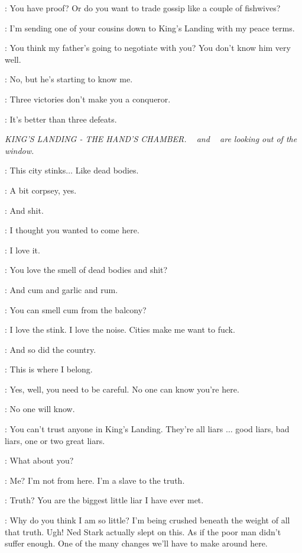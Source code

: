 \JAIME: You have proof? Or do you want to trade gossip like a couple of fishwives?

\ROBB: I'm sending one of your cousins down to King's Landing with my peace terms.

\JAIME: You think my father's going to negotiate with you? You don't know him very well.

\ROBB: No, but he's starting to know me.

\JAIME: Three victories don't make you a conqueror.

\ROBB: It's better than three defeats.


\scene

\textit{KING'S LANDING - THE HAND'S CHAMBER.  \SHAE~ and \TYRION~ are looking out of the window.}

\SHAE: This city stinks$\ldots$ Like dead bodies.

\TYRION: A bit corpsey, yes.

\SHAE: And shit.

\TYRION: I thought you wanted to come here.

\SHAE: I love it.

\TYRION: You love the smell of dead bodies and shit?

\SHAE: And cum and garlic and rum.

\TYRION: You can smell cum from the balcony?

\SHAE: I love the stink. I love the noise. Cities make me want to fuck.

\TYRION: And so did the country.

\SHAE: This is where I belong.

\TYRION: Yes, well, you need to be careful. No one can know you're here.

\SHAE: No one will know.

\TYRION: You can't trust anyone in King's Landing. They're all liars $\ldots$  good liars, bad liars, one or two great liars.

\SHAE: What about you?

\TYRION: Me? I'm not from here. I'm a slave to the truth.

\SHAE: Truth? You are the biggest little liar I have ever met.

\TYRION: Why do you think I am so little? I'm being crushed beneath the weight of all that truth.  Ugh! Ned Stark actually slept on this. As if the poor man didn't suffer enough. One of the many changes we'll have to make around here.


